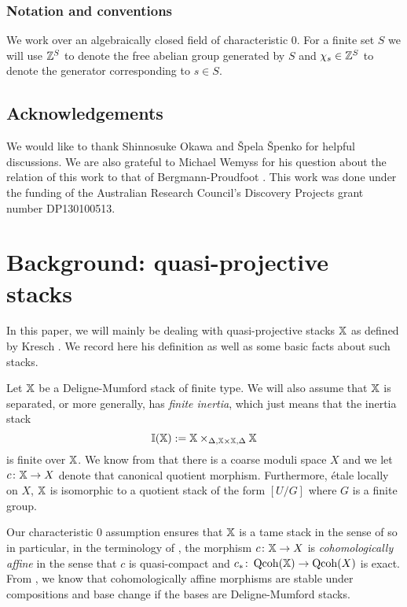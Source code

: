 \documentclass[12pt]{amsart}
\begin{document}
\subsubsection*{Notation and conventions}
We work over an algebraically closed field of characteristic 0.
For a finite set $S$ we will use $\mathbb{Z}^S$ to denote the free abelian group generated by $S$ and $\chi_s \in \mathbb{Z}^S$ to denote the generator corresponding to $s \in S$.

\subsection*{Acknowledgements}
We would like to thank Shinnosuke Okawa and \v{S}pela \v{S}penko for helpful discussions.
We are also grateful to Michael Wemyss for his question about the relation of this work to that of Bergmann-Proudfoot \cite{MR2421120}.
This work was done under the funding of the Australian Research Council's Discovery Projects grant number DP130100513.

\section{Background: quasi-projective stacks}

In this paper, we will mainly be dealing with quasi-projective stacks $\mathbb{X}$ as defined by Kresch \cite{Kr}. We record here his definition as well as some basic facts about such stacks.

Let $\mathbb{X}$ be a Deligne-Mumford stack of finite type. We will also assume that $\mathbb{X}$ is separated, or more generally, has {\em finite inertia}, which just means that the inertia stack $$\mathbb{I}(\mathbb{X}) :=\mathbb{X} \times_{\Delta,\mathbb{X} \times \mathbb{X} , \Delta} \mathbb{X}$$ 
is finite over $\mathbb{X}$. We know from \cite{KeM} that there is a coarse moduli space $X$ and we let $c\colon \mathbb{X} \to X$ denote that canonical quotient morphism. Furthermore, \'etale locally on $X$, $\mathbb{X}$ is isomorphic to a quotient stack of the form $[U/G]$ where $G$ is a finite group.

Our characteristic 0 assumption ensures that $\mathbb{X}$ is a tame stack in the sense of \cite{AOV} so in particular, in the terminology of \cite[Definition~3.1]{Alp}, the morphism $c \colon \mathbb{X} \to X$ is {\em cohomologically affine} in the sense that $c$ is quasi-compact and $c_* \colon \operatorname{Qcoh}(\mathbb{X}) \to \operatorname{Qcoh} (X)$ is exact.  From \cite[Proposition~3.10]{Alp}, we know that cohomologically affine morphisms are stable under compositions and base change if the bases are Deligne-Mumford stacks. 
\end{document}
